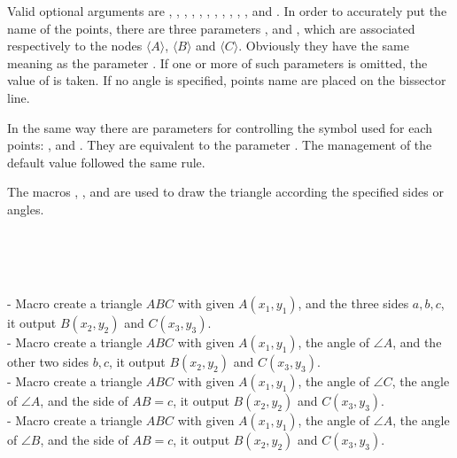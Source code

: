 \documentclass[11pt,english,BCOR=10mm,DIV=12,bibliography=totoc,parskip=false,headings=small,
    headinclude=false,footinclude=false,twoside,english]{pst-doc}
\def\Argsans#1{$\langle$#1$\rangle$}
\begin{document}
\begin{BDef}
\OptArgs{}
\end{BDef}


\begin{sloppypar}
Valid optional arguments are ,
  , %
  , ,
  , , ,
  , , ,
  , and .
%
In order to accurately put the name of the points, there are three parameters
,  and , which are associated
respectively to the nodes \Argsans{$A$}, \Argsans{$B$} and \Argsans{$C$}. Obviously
they have the same meaning as the parameter . If one or more of such
parameters is omitted, the value of  is taken.  If no angle
is specified, points name are placed on the bissector line.
\end{sloppypar}

In the same way there are parameters for controlling the symbol used
for each points: ,  and
. They are equivalent to the parameter
. The management of the default value followed the
same rule.

The macros , ,  and
 are used to draw the triangle according the specified sides
or angles.

\begin{BDef}
\OptArgs{}\\
\OptArgs{}\\
\OptArgs{}\\
\OptArgs{}
\end{BDef}


- Macro  create a triangle $ABC$ with given $A(x_1,y_1)$, and the three sides $a,b,c$,
it output $B(x_2,y_2)$ and $C(x_3,y_3)$.\\
- Macro  create a triangle $ABC$ with given $A(x_1,y_1)$, the angle of $\angle{A}$, and the other two sides $b,c$,
it output $B(x_2,y_2)$ and $C(x_3,y_3)$.\\
- Macro  create a triangle $ABC$ with given $A(x_1,y_1)$, the angle of $\angle{C}$, the angle of $\angle{A}$, and the side of $AB=c$,
it output $B(x_2,y_2)$ and $C(x_3,y_3)$.\\
- Macro  create a triangle $ABC$ with given $A(x_1,y_1)$, the angle of $\angle{A}$, the angle of $\angle{B}$, and the side of $AB=c$,
it output $B(x_2,y_2)$ and $C(x_3,y_3)$.
\end{document}
